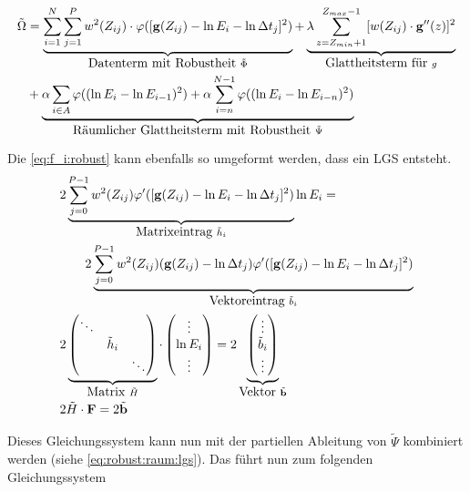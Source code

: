 \begin{align}
\tilde{\Omega} &= 
    \underbrace{\sum_{i=1}^{N} \sum_{j=1}^{P} w^2(Z_{ij})
    \cdot \varphi([\mathbf g(Z_{ij}) - \ln E_i - \ln \Delta t_j]^2)}_{\mbox{Datenterm mit Robustheit }\tilde{\Phi}}
    + \underbrace{\lambda  \sum_{z=Z_{min}+1}^{Z_{max}-1} [w(Z_{ij}) \cdot \mathbf g''(z)]^2}_{\mbox{Glattheitsterm für }g} \nonumber\\
    & + \underbrace{
        \alpha \sum_{i\in A}
            \varphi((\ln E_i - \ln E_{i-1})^2)
        +\alpha \sum_{i=n}^{N-1}\varphi((\ln E_i - \ln E_{i-n})^2)
    }_{\mbox{Räumlicher Glattheitsterm mit Robustheit }\Tilde \Psi}
\\
\end{align}

Die \autoref{eq:f_i:robust} kann ebenfalls so umgeformt werden, dass ein LGS entsteht. 
\begin{align}
    & 2 \underbrace{
        \sum_{j=0}^{P-1} 
            w^2(Z_{ij})
            \varphi'(
                [\mathbf g(Z_{ij})-\ln E_i - \ln \Delta t_j]^2
            )
    }_{\mbox{Matrixeintrag }\tilde h_i}
    \ln E_i = \nonumber \\
    &\qquad 2 \underbrace{
        \sum_{j=0}^{P-1} 
            w^2(Z_{ij})
            (\mathbf g(Z_{ij})-\ln \Delta t_j)
            \varphi'(
                [\mathbf g(Z_{ij})-\ln E_i - \ln \Delta t_j]^2
            )
    }_{\mbox{Vektoreintrag } \tilde b_i}\\
    &
    2 \underbrace{
        \begin{pmatrix}
            \ddots & &\\
            & \tilde h_i & \\
            & & \ddots
        \end{pmatrix}
    }_{\mbox{Matrix }\tilde H}
    \cdot
    \begin{pmatrix}
        \vdots\\ \ln E_i \\ \vdots
    \end{pmatrix}
    =
    2 \underbrace{
        \begin{pmatrix}
            \vdots\\ \tilde b_i \\ \vdots    
        \end{pmatrix}
    }_{\mbox{Vektor }\tilde{\mathbf b}}\\
    & 2 \tilde H \cdot \mathbf F = 2 \tilde{\mathbf{b}}
\end{align}

Dieses Gleichungssystem kann nun mit der partiellen Ableitung von $\tilde \Psi$ kombiniert werden (siehe \autoref{eq:robust:raum:lgs}). Das führt nun zum folgenden Gleichungssystem

